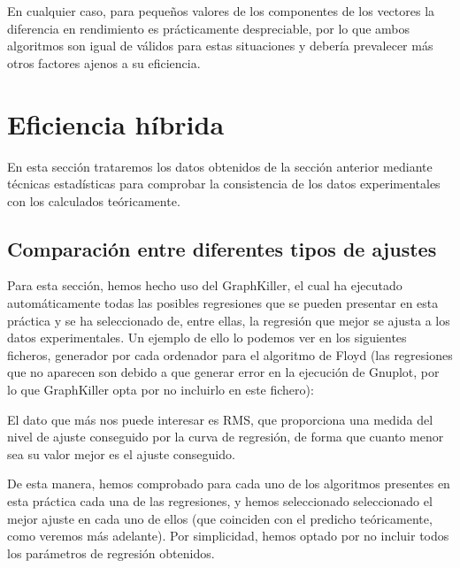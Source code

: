 \documentclass{homework}
\begin{document}
    En cualquier caso, para pequeños valores de los componentes de los vectores la diferencia en rendimiento es prácticamente despreciable, por
    lo que ambos algoritmos son igual de válidos para estas situaciones y debería prevalecer más otros factores ajenos a su eficiencia.

    \newpage
    \section{Eficiencia híbrida} 
    
    En esta sección trataremos los datos obtenidos de la sección anterior mediante técnicas estadísticas para
    comprobar la consistencia de los datos experimentales con los calculados teóricamente. 

    \subsection{Comparación entre diferentes tipos de ajustes}

    Para esta sección, hemos hecho uso del GraphKiller, el cual ha ejecutado automáticamente todas las posibles regresiones
    que se pueden presentar en esta práctica y se ha seleccionado de, entre ellas, la regresión que mejor se ajusta a los datos
    experimentales. Un ejemplo de ello lo podemos ver en los siguientes ficheros, generador por cada ordenador para el algoritmo de Floyd 
    (las regresiones que no aparecen son debido a que generar error en la ejecución de Gnuplot, por lo que GraphKiller opta por no
    incluirlo en este fichero):

    
    
    

    El dato que más nos puede interesar es RMS, que proporciona una medida del nivel de ajuste conseguido por la curva de regresión,
    de forma que cuanto menor sea su valor mejor es el ajuste conseguido. 

    De esta manera, hemos comprobado para cada uno de los algoritmos presentes en esta práctica cada una de las regresiones, 
    y hemos seleccionado seleccionado el mejor ajuste en cada uno de ellos (que coinciden con el predicho teóricamente, como veremos
    más adelante). Por simplicidad, hemos optado por no incluir todos los parámetros de regresión obtenidos. 
\end{document}
